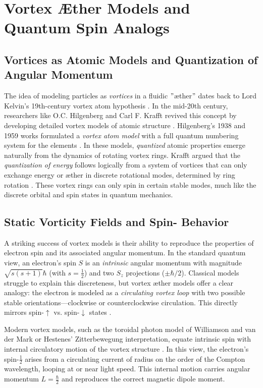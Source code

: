 \chapter*{Vortex Æther Models and Quantum Spin Analogs}


\section*{Vortices as Atomic Models and Quantization of Angular Momentum}

The idea of modeling particles as \textit{vortices} in a fluidic \("\)æther\("\) dates back to Lord Kelvin's 19th-century vortex atom hypothesis \cite{Dennis2020}. In the mid-20th century, researchers like O.C. Hilgenberg and Carl F. Krafft revived this concept by developing detailed vortex models of atomic structure \cite{Hilgenberg1938, KrafftEtherMatter}. Hilgenberg's 1938 and 1959 works formulated a \textit{vortex atom model} with a full quantum numbering system for the elements \cite{ReichBlackSun}. In these models, \textit{quantized} atomic properties emerge naturally from the dynamics of rotating vortex rings. Krafft argued that the \textit{quantization of energy} follows logically from a system of vortices that can only exchange energy or æther in discrete rotational modes, determined by ring rotation \cite{PadrakINE9}. These vortex rings can only spin in certain stable modes, much like the discrete orbital and spin states in quantum mechanics.


\section*{Static Vorticity Fields and Spin-\textonehalf{} Behavior}

A striking success of vortex models is their ability to reproduce the properties of electron spin and its associated angular momentum. In the standard quantum view, an electron's spin $S$ is an \textit{intrinsic} angular momentum with magnitude $\sqrt{s(s+1)}\hbar$ (with $s=\tfrac{1}{2}$) and two $S_z$ projections ($\pm \hbar/2$). Classical models struggle to explain this discreteness, but vortex æther models offer a clear analogy: the electron is modeled as a \textit{circulating vortex loop} with two possible stable orientations—clockwise or counterclockwise circulation. This directly mirrors spin-$\uparrow$ vs. spin-$\downarrow$ states \cite{KrafftEtherMatter}.


Modern vortex models, such as the toroidal photon model of Williamson and van der Mark or Hestenes' Zitterbewegung interpretation, equate intrinsic spin with internal circulatory motion of the vortex structure \cite{HestenesZitterbewegung}. In this view, the electron's spin-$\tfrac{1}{2}$ arises from a circulating current of radius on the order of the Compton wavelength, looping at or near light speed. This internal motion carries angular momentum $L=\tfrac{\hbar}{2}$ and reproduces the correct magnetic dipole moment.


